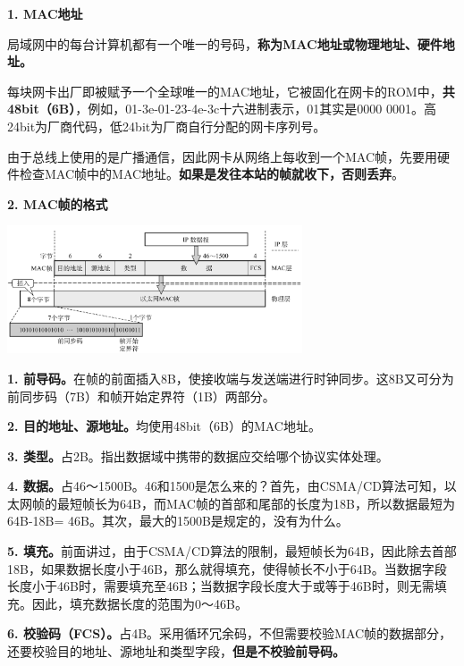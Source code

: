 \textbf{{1. MAC地址}}

{{局域网中的每台计算机都有一个唯一的号码，}}\textbf{{称为}{MAC地址或物理地址、硬件地址。}}

每块网卡出厂即被赋予一个全球唯一的MAC地址，它被固化在网卡的ROM中，{\textbf{共48bit（6B）}}，例如，01-3e-01-23-4e-3c十六进制表示，01其实是0000
0001。高24bit为厂商代码，低24bit为厂商自行分配的网卡序列号。

由于总线上使用的是广播通信，因此网卡从网络上每收到一个MAC帧，先要用硬件检查MAC帧中的MAC地址。{\textbf{如果是发往本站的帧就收下，否则丢弃}}。

\textbf{{2. MAC帧的格式}}

\includegraphics[width=3.43750in,height=1.48958in]{png-jpeg-pics/651DF8353E949C3F9F8C6D9FE2187538.png}

\textbf{1.
前导码。}在帧的前面插入8B，使接收端与发送端进行时钟同步。这8B又可分为前同步码（7B）和帧开始定界符（1B）两部分。

\textbf{2. 目的地址、源地址。}均使用48bit（6B）的MAC地址。

{\textbf{3. 类型。}占2B。指出数据域中携带的数据应交给哪个协议实体处理。}

{\textbf{4.
数据。}占46～1500B。46和1500是怎么来的？首先，由CSMA/CD算法可知，以太网帧的最短帧长为64B，而MAC帧的首部和尾部的长度为18B，所以数据最短为64B-18B=
46B。其次，最大的1500B是规定的，没有为什么。}

{\textbf{5.
填充。}前面讲过，由于CSMA/CD算法的限制，最短帧长为64B，因此除去首部18B，如果数据长度小于46B，那么就得填充，使得帧长不小于64B。当数据字段长度小于46B时，需要填充至46B；当数据字段长度大于或等于46B时，则无需填充。因此，填充数据长度的范围为0～46B。}

{\textbf{6.
校验码（FCS）。}占4B。采用循环冗余码，不但需要校验MAC帧的数据部分，还要校验目的地址、源地址和类型字段，\textbf{但是不校验前导码。}}

{}
